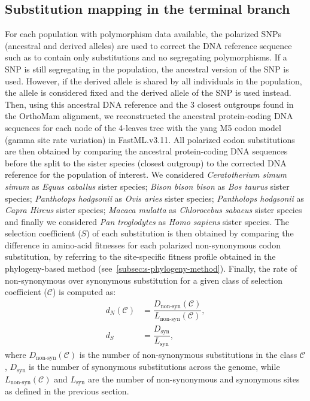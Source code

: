 \documentclass{article}
\newcommand{\dn}{d_N}
\newcommand{\ds}{d_S}
\newcommand{\Sphy}{S}
\newcommand{\Sphyclass}{\mathcal{C}}
\begin{document}
    \subsection*{Substitution mapping in the terminal branch}
    \label{subsec:substitution-mapping-in-the-terminal-branch}
    For each population with polymorphism data available, the polarized SNPs (ancestral and derived alleles) are used to correct the DNA reference sequence such as to contain only substitutions and no segregating polymorphisms.
    If a SNP is still segregating in the population, the ancestral version of the SNP is used.
    However, if the derived allele is shared by all individuals in the population, the allele is considered fixed and the derived allele of the SNP is used instead.
    Then, using this ancestral DNA reference and the $3$ closest outgroups found in the OrthoMam alignment, we reconstructed the ancestral protein-coding DNA sequences for each node of the 4-leaves tree with the yang M5 codon model (gamma site rate variation) in FastML.v3.11\cite{ashkenazy_fastml_2012}.
    All polarized codon substitutions are then obtained by comparing the ancestral protein-coding DNA sequences before the split to the sister species (closest outgroup) to the corrected DNA reference for the population of interest.
    We considered \textit{Ceratotherium simum simum} as \textit{Equus caballus} sister species; \textit{Bison bison bison} as \textit{Bos taurus} sister species; \textit{Pantholops hodgsonii} as \textit{Ovis aries} sister species; \textit{Pantholops hodgsonii} as \textit{Capra Hircus} sister species; \textit{Macaca mulatta} as \textit{Chlorocebus sabaeus} sister species and finally we considered \textit{Pan troglodytes} as \textit{Homo sapiens} sister species.
    The selection coefficient ($\Sphy$) of each substitution is then obtained by comparing the difference in amino-acid fitnesses for each polarized non-synonymous codon substitution, by referring to the site-specific fitness profile obtained in the phylogeny-based method (see~\ref{subsec:s-phylogeny-method}).
    Finally, the rate of non-synonymous over synonymous substitution for a given class of selection coefficient ($\Sphyclass$) is computed as:
    \begin{align}
        \dn \left( \Sphyclass \right) &= \dfrac{D_{\textrm{non-syn}}\left( \Sphyclass \right)}{L_{\textrm{non-syn}} \left( \Sphyclass \right)}, \\
        \ds &= \dfrac{D_{\textrm{syn}}}{L_{\textrm{syn}}},
    \end{align}
    where $D_{\textrm{non-syn}} \left( \Sphyclass \right) $ is the number of non-synonymous substitutions in the class $\Sphyclass$, $D_{\textrm{syn}}$ is the number of synonymous substitutions across the genome, while $L_{\textrm{non-syn}} \left( \Sphyclass \right)$ and $L_{\textrm{syn}}$ are the number of non-synonymous and synonymous sites as defined in the previous section.
\end{document}
